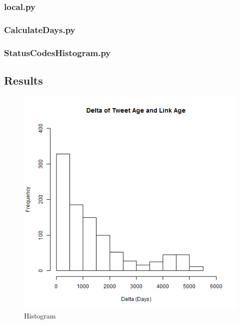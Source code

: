 \subsubsection{local.py}

\newpage
\subsubsection{CalculateDays.py}

\subsubsection{StatusCodesHistogram.py}

\newpage
\subsection{Results}



\newpage


\begin{figure}[ht]    
    \begin{center}
        \includegraphics[scale=0.60]{DeltaHistogram.png}
        \caption{Histogram}
        \label{RedirectHistogram}
    \end{center}
\end{figure}


